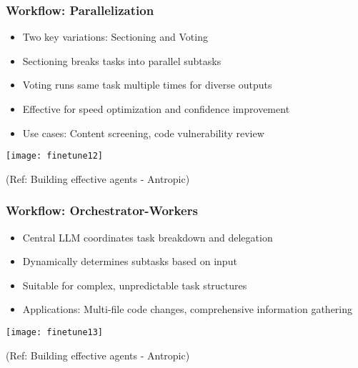 \begin{frame}[fragile]\frametitle{Workflow: Parallelization}
    \begin{itemize}
        \item Two key variations: Sectioning and Voting
        \item Sectioning breaks tasks into parallel subtasks
        \item Voting runs same task multiple times for diverse outputs
        \item Effective for speed optimization and confidence improvement
        \item Use cases: Content screening, code vulnerability review
    \end{itemize}
	
	\begin{center}
	\texttt{[image: finetune12]}
	\end{center}

	{\tiny (Ref: Building effective agents - Antropic)}			
\end{frame}

\begin{frame}[fragile]\frametitle{Workflow: Orchestrator-Workers}
    \begin{itemize}
        \item Central LLM coordinates task breakdown and delegation
        \item Dynamically determines subtasks based on input
        \item Suitable for complex, unpredictable task structures
        \item Applications: Multi-file code changes, comprehensive information gathering
    \end{itemize}
	
	\begin{center}
	\texttt{[image: finetune13]}
	\end{center}

	{\tiny (Ref: Building effective agents - Antropic)}			
\end{frame}

